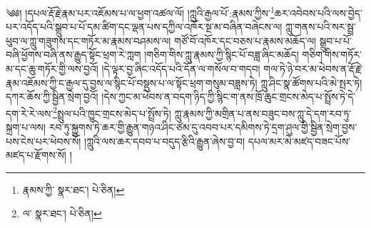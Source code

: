 \setcounter{footnote}{0} 
༄༅། །དཔལ་རྡོ་རྗེ་རྣམ་པར་འཇོམས་པ་ལ་ཕྱག་འཚལ་ལོ། །ཀླུའི་རྒྱལ་པོ་:རྣམས་ཀྱིས་\footnote{རྣམས་ཀྱི་  སྣར་ཐང་།  པེ་ཅིན། }ཆར་འབེབས་པའི་ལས་བྱེད་པར་འདོད་པའི་སྒྲུབ་པ་པོ་དམ་ཚིག་དང་ལྡན་པས་དཀྱིལ་འཁོར་སྔ་མ་བཞིན་བཞེངས་ལ། ཀླུ་གནས་པའི་སར་སྦྲ་ཕུབ་ལ་ཀླུ་གཟུགས་དང་གཏོར་མ་རྣམས་བཤམས་ལ། གཙོ་བོ་འཁོར་དང་བཅས་པ་རྣམས་མཆོད་ལ། སྒྲུབ་པ་པོ་བཞི་ཕྱོགས་བཞི་ནས་རྒྱུད་སྟོང་ཕྲག་རེ་ཀླག །གཅིག་གིས་ཀླུ་རྣམས་ཀྱི་སྙིང་པོ་བཟླ་ཞིང་མཆོད། གཅིག་གིས་གཏོར་མ་དང་ཆུ་གཏོར་གྱི་ལས་བྱའོ། །དེ་ལྟར་བྱ་ཞིང་འདོད་པའི་དོན་ལ་གསོལ་བ་གདབ། གལ་ཏེ་ཉེ་བར་མ་ཕེབས་ན་རྡོ་རྗེ་རྣམ་འཇོམས་ཀྱི་ང་རྒྱལ་དུ་བྱས་ལ་སྙིང་པོ་བསྡུས་པ་ལ་སྟོང་ཕྲག་གསུམ་བཟླས་ཏེ། ཀླུ་ཤིང་སྣ་ཚོགས་པའི་མེ་སྤར་ཏེ། དཀར་ཆོས་ཀྱི་སྦྱིན་སྲེག་བྱའོ། །དེས་ཀྱང་མ་ཕེབས་ན་བདག་ཉིད་ཀྱི་སྙིང་ག་ནས་ཁྲོ་ཆུང་གྲངས་མེད་པ་སྤྲོས་ཏེ་དེ་དག་རེ་རེ་ལས་\footnote{ལ་  སྣར་ཐང་།  པེ་ཅིན། }སྤྲུལ་པའི་ཁྱུང་གྲངས་མེད་པ་སྤྲོས་ཏེ། ཀླུ་རྣམས་ཀྱི་མགྲིན་པ་ནས་བཟུང་བས་ཀླུ་དེ་དག་རབ་ཏུ་སྐྲག་པ་ལས། རབ་ཏུ་སྐྱུགས་ཏེ་ཆར་གྱི་རྒྱུན་གཉའ་ཤིང་ཙམ་དུ་འབབ་པར་དམིགས་ཏེ་དྲག་ཤུལ་གྱི་སྦྱིན་སྲེག་བྱས་པས་ངེས་པར་ཕེབས་སོ། །ཀླུའི་ལས་ཆར་དབབ་པ་བདུད་རྩིའི་རྒྱུན་ཞེས་བྱ་བ། དཔལ་མར་མེ་མཛད་བཟང་པོས་མཛད་པ་རྫོགས་སོ། ། 
